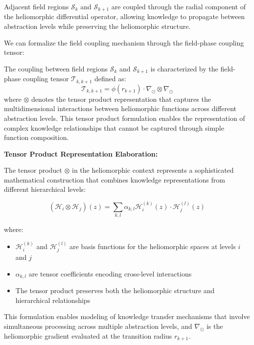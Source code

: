 \begin{definition}
\begin{theorem}
\begin{corollary}
Adjacent field regions $\mathcal{S}_k$ and $\mathcal{S}_{k+1}$ are coupled through the radial component of the heliomorphic differential operator, allowing knowledge to propagate between abstraction levels while preserving the heliomorphic structure.
\end{corollary}

We can formalize the field coupling mechanism through the field-phase coupling tensor:

\begin{definition}
The coupling between field regions $\mathcal{S}_k$ and $\mathcal{S}_{k+1}$ is characterized by the field-phase coupling tensor $\mathcal{T}_{k,k+1}$ defined as:
\begin{equation}
\mathcal{T}_{k,k+1} = \phi(r_{k+1}) \cdot \nabla_{\odot} \otimes \nabla_{\odot}
\end{equation}
where $\otimes$ denotes the tensor product representation that captures the multidimensional interactions between heliomorphic functions across different abstraction levels. This tensor product formulation enables the representation of complex knowledge relationships that cannot be captured through simple function composition.

\textbf{Tensor Product Representation Elaboration:}

The tensor product $\otimes$ in the heliomorphic context represents a sophisticated mathematical construction that combines knowledge representations from different hierarchical levels:

\begin{equation}
(\mathcal{H}_i \otimes \mathcal{H}_j)(z) = \sum_{k,l} \alpha_{k,l} \mathcal{H}_i^{(k)}(z) \cdot \mathcal{H}_j^{(l)}(z)
\end{equation}

where:
\begin{itemize}
    \item $\mathcal{H}_i^{(k)}$ and $\mathcal{H}_j^{(l)}$ are basis functions for the heliomorphic spaces at levels $i$ and $j$
    \item $\alpha_{k,l}$ are tensor coefficients encoding cross-level interactions
    \item The tensor product preserves both the heliomorphic structure and hierarchical relationships
\end{itemize}

This formulation enables modeling of knowledge transfer mechanisms that involve simultaneous processing across multiple abstraction levels, and $\nabla_{\odot}$ is the heliomorphic gradient evaluated at the transition radius $r_{k+1}$.
\end{definition}


\end{theorem}
\end{definition}
